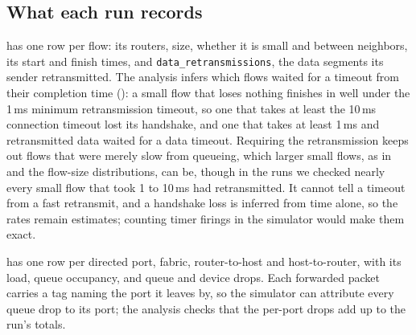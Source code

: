 \subsection{What each run records}

 has one row per flow: its routers, size, whether it is small and between neighbors, its start and finish times, and \texttt{data\_retransmissions}, the data segments its sender retransmitted. The analysis infers which flows waited for a timeout from their completion time (): a small flow that loses nothing finishes in well under the 1\,ms minimum retransmission timeout, so one that takes at least the 10\,ms connection timeout lost its handshake, and one that takes at least 1\,ms and retransmitted data waited for a data timeout. Requiring the retransmission keeps out flows that were merely slow from queueing, which larger small flows, as in  and the flow-size distributions, can be, though in the runs we checked nearly every small flow that took 1 to 10\,ms had retransmitted. It cannot tell a timeout from a fast retransmit, and a handshake loss is inferred from time alone, so the rates remain estimates; counting timer firings in the simulator would make them exact.

 has one row per directed port, fabric, router-to-host and host-to-router, with its load, queue occupancy, and queue and device drops. Each forwarded packet carries a tag naming the port it leaves by, so the simulator can attribute every queue drop to its port; the analysis checks that the per-port drops add up to the run's totals.
